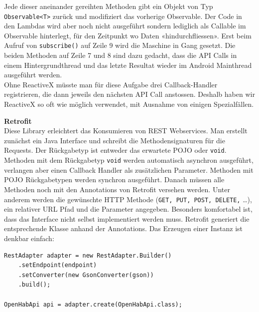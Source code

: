 Jede dieser aneinander gereihten Methoden gibt ein Objekt von Typ \lstinline!Observable<T>! zurück und modifiziert das vorherige Observable. Der Code in den Lambdas wird aber noch nicht ausgeführt sondern lediglich als Callable im Observable hinterlegt, für den Zeitpunkt wo Daten «hindurchfliessen». Erst beim Aufruf von \lstinline!subscribe()! auf Zeile 9 wird die Maschine in Gang gesetzt. Die beiden Methoden auf Zeile 7 und 8 sind dazu gedacht, dass die API Calls in einem Hintergrundthread und das letzte Resultat wieder im Android Mainthread ausgeführt werden. \\
Ohne ReactiveX müsste man für diese Aufgabe drei Callback-Handler registrieren, die dann jeweils den nächsten API Call anstossen. Deshalb haben wir ReactiveX so oft wie möglich verwendet, mit Ausnahme von einigen Spezialfällen. 

\textbf{Retrofit} \\
Diese Library erleichtert das Konsumieren von REST Webservices. Man erstellt zunächst ein Java Interface und schreibt die Methodensignaturen für die Requests. Der Rückgabetyp ist entweder das erwartete POJO oder \lstinline!void!. Methoden mit dem Rückgabetyp \lstinline!void! werden automatisch asynchron ausgeführt, verlangen aber einen Callback Handler als zusätzlichen Parameter. Methoden mit POJO Rückgabetypen werden synchron ausgeführt. Danach müssen alle Methoden noch mit den Annotations von Retrofit versehen werden. Unter anderem werden die gewünschte HTTP Methode (\lstinline!GET, PUT, POST, DELETE,! \ldots), ein relativer URL Pfad und die Parameter angegeben. Besonders komfortabel ist, dass das Interface nicht selbst implementiert werden muss. Retrofit generiert die entsprechende Klasse anhand der Annotations. Das Erzeugen einer Instanz ist denkbar einfach:

\begin{lstlisting}[style=csharp, label=lst:retrofitCreation, caption=Retrofit - Service-Klasse generieren]
RestAdapter adapter = new RestAdapter.Builder()
	.setEndpoint(endpoint)
	.setConverter(new GsonConverter(gson))
	.build();
	
OpenHabApi api = adapter.create(OpenHabApi.class);
\end{lstlisting}

